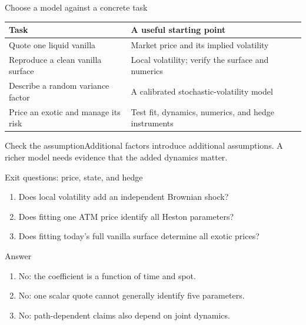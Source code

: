 \documentclass[handout,10pt,t,aspectratio=169]{beamer}
\newenvironment{answerbox}{\begin{exampleblock}{Answer}}{\end{exampleblock}}
\newenvironment{watchbox}{\begin{alertblock}{Check the assumption}}{\end{alertblock}}
\begin{document}
\begin{frame}{Choose a model against a concrete task}

    \begin{center}\begin{tabular}{L{.33\textwidth}L{.53\textwidth}}
    \toprule Task & A useful starting point\\\midrule
    Quote one liquid vanilla & Market price and its implied volatility\\[.5em]
    Reproduce a clean vanilla surface & Local volatility; verify the surface and numerics\\[.5em]
    Describe a random variance factor & A calibrated stochastic-volatility model\\[.5em]
    Price an exotic and manage its risk & Test fit, dynamics, numerics, and hedge instruments\\\bottomrule
    \end{tabular}\end{center}
    \begin{watchbox}Additional factors introduce additional assumptions.
    A richer model needs evidence that the added dynamics matter.\end{watchbox}
\end{frame}

\begin{frame}{Exit questions: price, state, and hedge}

    \begin{enumerate}
    \item Does local volatility add an independent Brownian shock?
    \item Does fitting one ATM price identify all Heston parameters?
    \item Does fitting today's full vanilla surface determine all exotic prices?
    \end{enumerate}
    \begin{answerbox}
    \begin{enumerate}
    \item No: the coefficient is a function of time and spot.
    \item No: one scalar quote cannot generally identify five parameters.
    \item No: path-dependent claims also depend on joint dynamics.
    \end{enumerate}\end{answerbox}
\end{frame}
\end{document}
